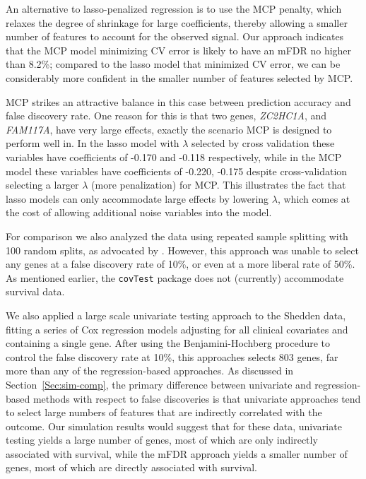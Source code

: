 An alternative to lasso-penalized regression is to use the MCP penalty, which relaxes the degree of shrinkage for large coefficients, thereby allowing a smaller number of features to account for the observed signal.  Our approach indicates that the MCP model minimizing CV error is likely to have an mFDR no higher than 8.2\%; compared to the lasso model that minimized CV error, we can be considerably more confident in the smaller number of features selected by MCP.

MCP strikes an attractive balance in this case between prediction accuracy and false discovery rate.  One reason for this is that two genes, \textit{ZC2HC1A}, and \textit{FAM117A}, have very large effects, exactly the scenario MCP is designed to perform well in. In the lasso model with $\lambda$ selected by cross validation these variables have coefficients of -0.170 and -0.118 respectively, while in the MCP model these variables have coefficients of -0.220, -0.175 despite cross-validation selecting a larger $\lambda$ (more penalization) for MCP.  This illustrates the fact that lasso models can only accommodate large effects by lowering $\lambda$, which comes at the cost of allowing additional noise variables into the model.

For comparison we also analyzed the data using repeated sample splitting with 100 random splits, as advocated by  \citet{Meinshausen2009}. However, this approach was unable to select any genes at a false discovery rate of 10\%, or even at a more liberal rate of 50\%.
As mentioned earlier, the {\tt covTest} package does not (currently) accommodate survival data.

We also applied a large scale univariate testing approach to the Shedden data, fitting a series of Cox regression models adjusting for all clinical covariates and containing a single gene.  After using the Benjamini-Hochberg procedure to control the false discovery rate at 10\%, this approaches selects 803 genes, far more than any of the regression-based approaches.  As discussed in Section~\ref{Sec:sim-comp}, the primary difference between univariate and regression-based methods with respect to false discoveries is that univariate approaches tend to select large numbers of features that are indirectly correlated with the outcome.  Our simulation results would suggest that for these data, univariate testing yields a large number of genes, most of which are only indirectly associated with survival, while the mFDR approach yields a smaller number of genes, most of which are directly associated with survival.


